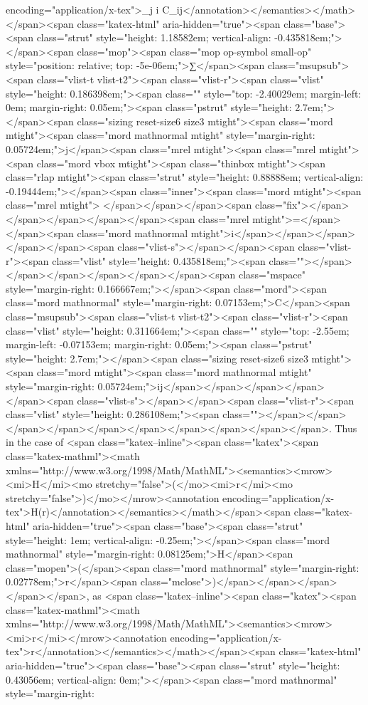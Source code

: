 encoding="application/x-tex">\sum_{j \neq i} C_{ij}</annotation></semantics></math></span><span class="katex-html" aria-hidden="true"><span class="base"><span class="strut" style="height: 1.18582em; vertical-align: -0.435818em;"></span><span class="mop"><span class="mop op-symbol small-op" style="position: relative; top: -5e-06em;">∑</span><span class="msupsub"><span class="vlist-t vlist-t2"><span class="vlist-r"><span class="vlist" style="height: 0.186398em;"><span class="" style="top: -2.40029em; margin-left: 0em; margin-right: 0.05em;"><span class="pstrut" style="height: 2.7em;"></span><span class="sizing reset-size6 size3 mtight"><span class="mord mtight"><span class="mord mathnormal mtight" style="margin-right: 0.05724em;">j</span><span class="mrel mtight"><span class="mrel mtight"><span class="mord vbox mtight"><span class="thinbox mtight"><span class="rlap mtight"><span class="strut" style="height: 0.88888em; vertical-align: -0.19444em;"></span><span class="inner"><span class="mord mtight"><span class="mrel mtight"></span></span></span><span class="fix"></span></span></span></span></span><span class="mrel mtight">=</span></span><span class="mord mathnormal mtight">i</span></span></span></span></span><span class="vlist-s">​</span></span><span class="vlist-r"><span class="vlist" style="height: 0.435818em;"><span class=""></span></span></span></span></span></span><span class="mspace" style="margin-right: 0.166667em;"></span><span class="mord"><span class="mord mathnormal" style="margin-right: 0.07153em;">C</span><span class="msupsub"><span class="vlist-t vlist-t2"><span class="vlist-r"><span class="vlist" style="height: 0.311664em;"><span class="" style="top: -2.55em; margin-left: -0.07153em; margin-right: 0.05em;"><span class="pstrut" style="height: 2.7em;"></span><span class="sizing reset-size6 size3 mtight"><span class="mord mtight"><span class="mord mathnormal mtight" style="margin-right: 0.05724em;">ij</span></span></span></span></span><span class="vlist-s">​</span></span><span class="vlist-r"><span class="vlist" style="height: 0.286108em;"><span class=""></span></span></span></span></span></span></span></span></span></span>. Thus in the case of <span class="katex--inline"><span class="katex"><span class="katex-mathml"><math xmlns="http://www.w3.org/1998/Math/MathML"><semantics><mrow><mi>H</mi><mo stretchy="false">(</mo><mi>r</mi><mo stretchy="false">)</mo></mrow><annotation encoding="application/x-tex">H(r)</annotation></semantics></math></span><span class="katex-html" aria-hidden="true"><span class="base"><span class="strut" style="height: 1em; vertical-align: -0.25em;"></span><span class="mord mathnormal" style="margin-right: 0.08125em;">H</span><span class="mopen">(</span><span class="mord mathnormal" style="margin-right: 0.02778em;">r</span><span class="mclose">)</span></span></span></span></span>, as <span class="katex--inline"><span class="katex"><span class="katex-mathml"><math xmlns="http://www.w3.org/1998/Math/MathML"><semantics><mrow><mi>r</mi></mrow><annotation encoding="application/x-tex">r</annotation></semantics></math></span><span class="katex-html" aria-hidden="true"><span class="base"><span class="strut" style="height: 0.43056em; vertical-align: 0em;"></span><span class="mord mathnormal" style="margin-right: 
